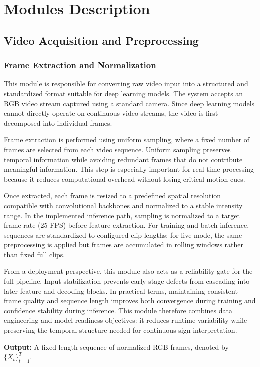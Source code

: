 \section{Modules Description}
\subsection{Video Acquisition and Preprocessing}
\subsubsection{Frame Extraction and Normalization}
This module is responsible for converting raw video input into a structured and standardized format suitable for deep learning models. The system accepts an RGB video stream captured using a standard camera. Since deep learning models cannot directly operate on continuous video streams, the video is first decomposed into individual frames.

Frame extraction is performed using uniform sampling, where a fixed number of frames are selected from each video sequence. Uniform sampling preserves temporal information while avoiding redundant frames that do not contribute meaningful information. This step is especially important for real-time processing because it reduces computational overhead without losing critical motion cues.

Once extracted, each frame is resized to a predefined spatial resolution compatible with convolutional backbones and normalized to a stable intensity range. In the implemented inference path, sampling is normalized to a target frame rate (25 FPS) before feature extraction. For training and batch inference, sequences are standardized to configured clip lengths; for live mode, the same preprocessing is applied but frames are accumulated in rolling windows rather than fixed full clips.

From a deployment perspective, this module also acts as a reliability gate for the full pipeline. Input stabilization prevents early-stage defects from cascading into later feature and decoding blocks. In practical terms, maintaining consistent frame quality and sequence length improves both convergence during training and confidence stability during inference. This module therefore combines data engineering and model-readiness objectives: it reduces runtime variability while preserving the temporal structure needed for continuous sign interpretation.

\textbf{Output:} A fixed-length sequence of normalized RGB frames, denoted by $\{X_t\}_{t=1}^{T}$.

